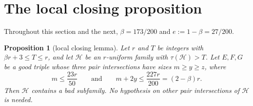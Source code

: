 \documentclass[11pt]{amsart}
\newtheorem{proposition}[theorem]{Proposition}
\theoremstyle{definition}
\theoremstyle{remark}
\newcommand{\cH}{\mathcal H}
\begin{document}
\section{The local closing proposition}\label{sec:local}

Throughout this section and the next, $\beta=173/200$ and $e:=1-\beta=27/200$.

\begin{proposition}[local closing lemma]\label{prop:local}
Let $r$ and $T$ be integers with $\beta r+3\le T\le r$, and let $\cH$ be an $r$-uniform family with $\tau(\cH)>T$. Let $E,F,G$ be a good triple whose three pair intersections have sizes $m\ge y\ge z$, where
\[
m\le\frac{23r}{50}\qquad\text{and}\qquad m+2y\le\frac{227r}{200}=(2-\beta)r .
\]
Then $\cH$ contains a bad subfamily. No hypothesis on other pair intersections of $\cH$ is needed.
\end{proposition}
\end{document}
